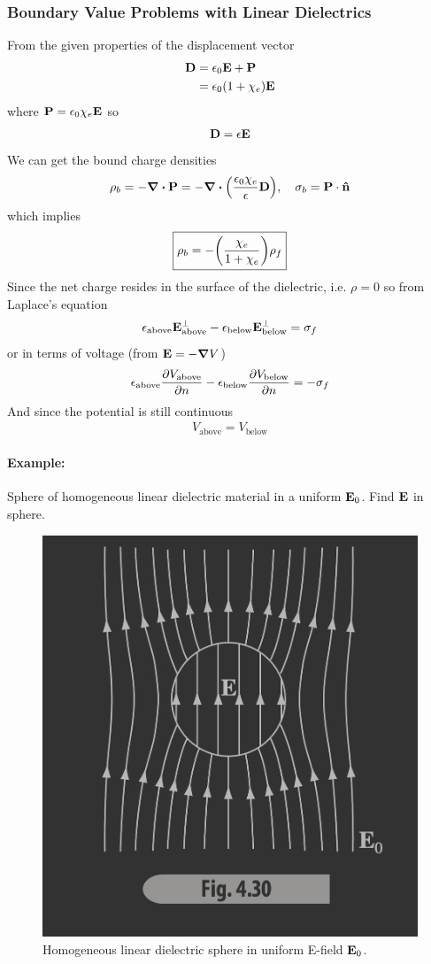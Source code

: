 \documentclass[../main.tex]{subfiles}
\begin{document}
\subsubsection*{Boundary Value Problems with Linear Dielectrics}

From the given properties of the displacement vector
\begin{align*}
    \vb D &= \epsilon_0 \vb E + \vb P \\
    &= \epsilon_0 (1 + \chi_e) \vb E 
\end{align*}
where $\vb P = \epsilon_0 \chi_e \vb E$ so
\begin{align*}
    \vb D = \epsilon \vb E
\end{align*}
We can get the bound charge densities
\begin{align*}
    \rho_b = -\div \vb P = -\div(\frac{\epsilon_0 \chi_e}{\epsilon} \vb D), \quad \sigma_b = \vb P \cdot \vu n
\end{align*}
which implies
\begin{align*}
    \boxed{
        \rho_b = -\qt(\frac{\chi_e}{1 + \chi_e}) \rho_f
    }
\end{align*}
Since the net charge resides in the surface of the dielectric, i.e. $\rho = 0$ so from Laplace's equation
\begin{align*}
    \epsilon_\text{above} \vb E_\text{above}^\perp - \epsilon_\text{below} \vb E_\text{below}^\perp = \sigma_f
\end{align*}
or in terms of voltage (from $\vb E = -\grad V$)
\begin{align*}
    \epsilon_\text{above} \pdv{V_\text{above}}{n} - \epsilon_\text{below} \pdv{V_\text{below}}{n} = -\sigma_f
\end{align*}
And since the potential is still continuous
\begin{align*}
    V_\text{above} = V_\text{below}
\end{align*}

\paragraph{Example:} Sphere of homogeneous linear dielectric material in a uniform $\vb E_0$.
Find $\vb E$ in sphere.

\begin{figure}[ht]
    \centering
    \includegraphics[width=0.3\linewidth]{fig4_30.png}
    \caption{Homogeneous linear dielectric sphere in uniform E-field $\vb E_0$.} 
    \label{fig:4_30}
\end{figure}
\end{document}
